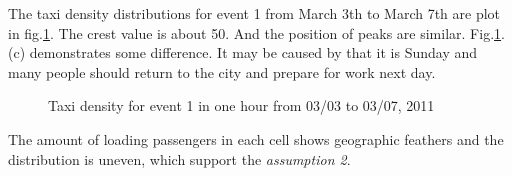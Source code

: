 The taxi density distributions for event 1 from March 3th to March 7th are plot in fig.\ref{figure_taxi_density_for_5days}. The crest value is about 50. And the position of peaks are similar. Fig.\ref{figure_taxi_density_for_5days}.(c) demonstrates some difference. It may be caused by that it is Sunday and many people should return to the city and prepare for work next day.

\begin{figure}[htbp]
\centering

\caption{Taxi density for event 1 in one hour from 03/03 to 03/07, 2011}\label{figure_taxi_density_for_5days}
\end{figure}

The amount of loading passengers in each cell shows geographic feathers and the distribution is uneven, which support the \emph{assumption 2}. 